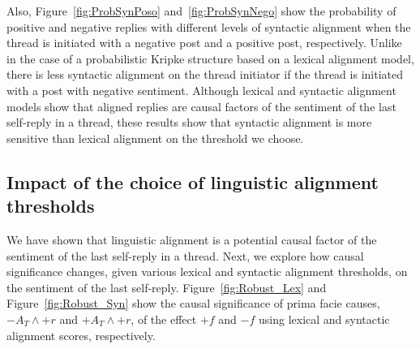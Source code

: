 \documentclass[man,biblatex,floatsintext]{apa6}
\begin{document}
Also, Figure~\ref{fig:ProbSynPoso} and~\ref{fig:ProbSynNego} show the probability of positive and negative replies with different levels of syntactic alignment when the thread is initiated with a negative post and a positive post, respectively. Unlike in the case of a probabilistic Kripke structure based on a lexical alignment model, there is less syntactic alignment on the thread initiator if the thread is initiated with a post with negative sentiment. Although lexical and syntactic alignment models show that aligned replies are causal factors of the sentiment of the last self-reply in a thread, these results show that syntactic alignment is more sensitive than lexical alignment on the threshold we choose. 




\subsection{Impact of the choice of linguistic alignment thresholds}

We have shown that linguistic alignment is a potential causal factor of the sentiment of the last self-reply in a thread. Next, we explore how causal significance changes, given various lexical and syntactic alignment thresholds, on the sentiment of the last self-reply. Figure~\ref{fig:Robust_Lex} and Figure~\ref{fig:Robust_Syn} show the causal significance of prima facie causes, $-A_T \wedge +r$ and $+A_T \wedge +r$, of the effect $+f$ and $-f$ using lexical and syntactic alignment scores, respectively. 
\end{document}
